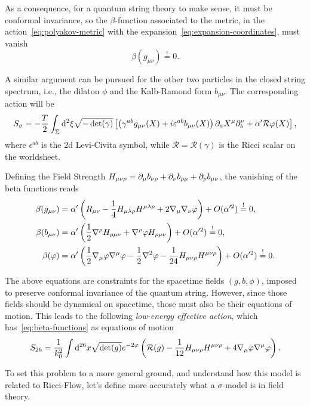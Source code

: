 As a consequence, for a quantum string theory to make sense, it must be conformal invariance, so the $\beta$-function associated to the metric, in the action~\eqref{eq:polyakov-metric} with the expansion~\eqref{eq:expansion-coordinates}, must vanish
\begin{equation}
    \beta(g_{\mu\nu}) \overset{!}{=} 0.
\end{equation} 

A similar argument can be pursued for the other two particles in the closed string spectrum, i.e., the dilaton $\phi$ and the Kalb-Ramond form $b_{\mu\nu}$. The corresponding action will be
\begin{equation}
    S_\sigma = -\frac{T}{2} \int_\Sigma \mathop{}\!\mathrm{d}^2 \xi \sqrt{-\det(\gamma)}\left[ \left( \gamma^{ab} g_{\mu\nu}(X) + i \varepsilon^{ab} b_{\mu\nu}(X) \right) \partial_a X^\mu \partial_b ^\nu + \alpha' \mathcal{R} \varphi(X) \right],
\end{equation}
where $\epsilon^{ab}$ is the $2$d Levi-Civita symbol, while $\mathcal{R} = \mathcal{R}(\gamma)$ is the Ricci scalar on the worldsheet.

Defining the Field Strength $H_{\mu\nu\rho} = \partial_\mu b_{\nu\rho} + \partial_\nu b_{\rho\mu} + \partial_\rho b_{\mu\nu}$, the vanishing of the beta functions reads
\begin{subequations}\label{eq:beta-functions}
\begin{align}
    \beta(g_{\mu\nu}) &= \alpha' \left( R_{\mu\nu} - \frac{1}{4} H_{\mu\lambda\rho} H^{\mu\lambda\rho} + 2 \nabla_\mu \nabla_\nu \varphi \right) + O(\alpha'^2)\overset{!}{=} 0,\\
    \beta(b_{\mu\nu}) &= \alpha' \left( \frac{1}{2} \nabla^\rho H_{\rho\mu\nu} + \nabla^\rho \varphi H_{\rho\mu\nu} \right) + O(\alpha'^2)\overset{!}{=} 0, \\
    \beta(\varphi) &= \alpha' \left( \frac{1}{2} \nabla_\mu \varphi \nabla^\mu \varphi - \frac{1}{2} \nabla^2 \varphi - \frac{1}{24} H_{\mu\nu\rho} H^{\mu\nu\rho} \right) + O(\alpha'^2)\overset{!}{=} 0.
\end{align}
\end{subequations}

The above equations are constraints for the spacetime fields $(g,b,\phi)$, imposed to preserve conformal invariance of the quantum string. However, since those fields should be dynamical on spacetime, those must also be their equations of motion. This leads to the following \emph{low-energy effective action}, which has~\eqref{eq:beta-functions} as equations of motion
\begin{equation}
    S_{26} = \frac{1}{k^2_0} \int \mathop{}\!\mathrm{d}^{26}x \sqrt{\det(g)} e^{-2\varphi} \left( \mathcal{R}(g) - \frac{1}{12} H_{\mu\nu\rho} H^{\mu\nu\rho} + 4 \nabla_\mu \varphi \nabla^\mu \varphi \right).
\end{equation}

To set this problem to a more general ground, and understand how this model is related to Ricci-Flow, let's define more accurately what a $\sigma$-model is in field theory.